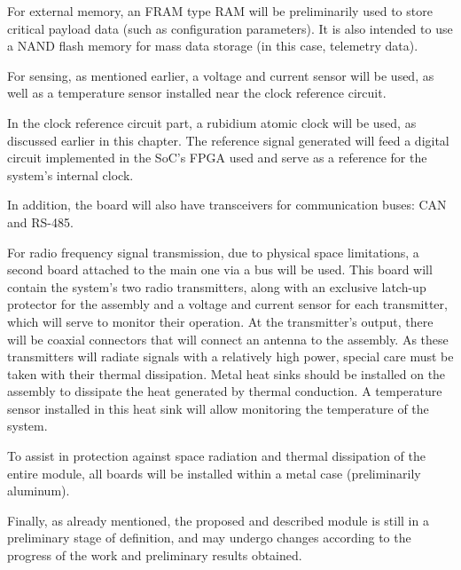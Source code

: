 For external memory, an FRAM type RAM will be preliminarily used to store critical payload data (such as configuration parameters). It is also intended to use a NAND flash memory for mass data storage (in this case, telemetry data).

For sensing, as mentioned earlier, a voltage and current sensor will be used, as well as a temperature sensor installed near the clock reference circuit.

In the clock reference circuit part, a rubidium atomic clock will be used, as discussed earlier in this chapter. The reference signal generated will feed a digital circuit implemented in the SoC's FPGA used and serve as a reference for the system's internal clock.

In addition, the board will also have transceivers for communication buses: CAN and RS-485.

For radio frequency signal transmission, due to physical space limitations, a second board attached to the main one via a bus will be used. This board will contain the system's two radio transmitters, along with an exclusive latch-up protector for the assembly and a voltage and current sensor for each transmitter, which will serve to monitor their operation. At the transmitter's output, there will be coaxial connectors that will connect an antenna to the assembly. As these transmitters will radiate signals with a relatively high power, special care must be taken with their thermal dissipation. Metal heat sinks should be installed on the assembly to dissipate the heat generated by thermal conduction. A temperature sensor installed in this heat sink will allow monitoring the temperature of the system.

To assist in protection against space radiation and thermal dissipation of the entire module, all boards will be installed within a metal case (preliminarily aluminum).

Finally, as already mentioned, the proposed and described module is still in a preliminary stage of definition, and may undergo changes according to the progress of the work and preliminary results obtained.